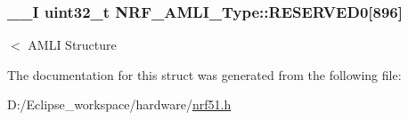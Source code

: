 \subsubsection[{R\+E\+S\+E\+R\+V\+E\+D0}]{\setlength{\rightskip}{0pt plus 5cm}\+\_\+\+\_\+\+I uint32\+\_\+t N\+R\+F\+\_\+\+A\+M\+L\+I\+\_\+\+Type\+::\+R\+E\+S\+E\+R\+V\+E\+D0\mbox{[}896\mbox{]}}\label{struct_n_r_f___a_m_l_i___type_a1a10dbade8ef7bb274f1fc952f7b94e6}
$<$ A\+M\+L\+I Structure 

The documentation for this struct was generated from the following file\+:\begin{DoxyCompactItemize}
\item 
D\+:/\+Eclipse\+\_\+workspace/hardware/\hyperlink{nrf51_8h}{nrf51.\+h}\end{DoxyCompactItemize}
